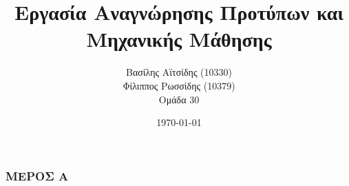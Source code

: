 \documentclass{beamer}
\title[Ομάδα 30] %
{Εργασία Αναγνώρησης Προτύπων και Μηχανικής Μάθησης}
\author[Βασίλης Αϊτσίδης, Φίλιππος Ρωσσίδης]
{Βασίλης Αϊτσίδης (10330) \\ Φίλιππος Ρωσσίδης (10379) \\ Ομάδα 30}
\institute{ΑΠΘ}
\date{\today}
\begin{document}
\frame{\titlepage}

\begin{frame}
\frametitle{ΜΕΡΟΣ Α}


\end{frame}
\end{document}

